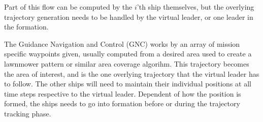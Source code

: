 \documentclass[a4paper,conference]{IEEEtran}
\begin{document}
Part of this flow can be computed by the $i$'th ship themselves, but
the overlying trajectory generation needs to be handled by the virtual
leader, or one leader in the formation.

The Guidance Navigation and Control (GNC) works by an array of mission specific waypoints given,
usually computed from a desired area used to create a lawnmower
pattern or similar area coverage algorihm. This trajectory
becomes the area of interest, and is the one overlying trajectory that
the virtual leader has to follow. The other ships will need to
maintain their individual positions at all time steps respective to
the virtual leader. Dependent of how the position is formed, the ships
needs to go into formation before or during the trajectory tracking
phase.

%


\end{document}
